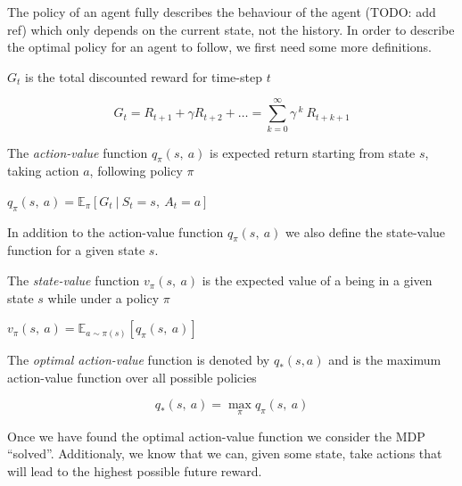 The policy of an agent fully describes the behaviour of the agent (TODO: add ref) which only depends on the current state, not the history. In order to describe the optimal policy for an agent to follow, we first need some more definitions.

\begin{defn}
	$G_t$ is the total discounted reward for time-step $t$
	\vspace*{-7mm}
	\begin{center}
		$$G_t = R_{t+1} + \gamma R_{t+2} + \dots = \sum_{k=0}^{\infty}\gamma^{~k}~R_{t+k+1}$$
	\end{center}
\end{defn}

\begin{defn}
	\label{action-value-func}
	The \textit{action-value} function $q_\pi(s,~a)$ is expected return starting from state $s$, taking action $a$, following policy $\pi$
	\begin{center}
		$q_\pi(s,~a)=\mathbb{E}_\pi[G_t~|~S_t=s,~A_t=a]$
	\end{center}
\end{defn}

\noindent In addition to the action-value function $q_\pi(s,~a)$ we also define the state-value function for a given state $s$.

\begin{defn}
	\label{state-value-func}
	The \textit{state-value} function $v_\pi(s,~a)$ is the expected value of a being in a given state $s$ while under a policy $\pi$

	\begin{center}
		$v_\pi(s,~a) = \mathbb{E}_{a\sim \pi(s)}\left[q_\pi(s,~a)\right]$
	\end{center}
\end{defn}

\begin{defn}
	The \textit{optimal action-value} function is denoted by $q_*(s, a)$ and is the maximum action-value function over all possible policies
	\vspace*{-7mm}
	\begin{center}
		$$q_*(s,~a)=\max_\pi q_\pi(s,~a)$$
	\end{center}
\end{defn}

Once we have found the optimal action-value function we consider the MDP ``solved''. Additionaly, we know that we can, given some state, take actions that will lead to the highest possible future reward.

